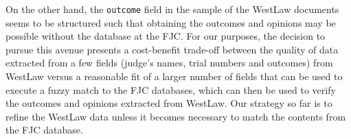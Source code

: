 \documentclass[11pt]{paper}
\begin{document}
On the other hand, the \texttt{outcome} field in the sample of the WestLaw documents seems to be structured such that obtaining the outcomes and opinions may be possible without the database at the FJC. 
For our purposes, the decision to pursue this avenue presents a cost-benefit
trade-off between the quality of data extracted from a few fields (judge's names, trial numbers and outcomes) from WestLaw
versus a reasonable fit of a larger number of fields that can be used to
execute a fuzzy match to the FJC databases, which can then be used to verify the outcomes and opinions extracted from WestLaw. 
Our strategy so far is to refine the WestLaw data unless it becomes necessary to match the contents from the FJC database. 
\end{document}
